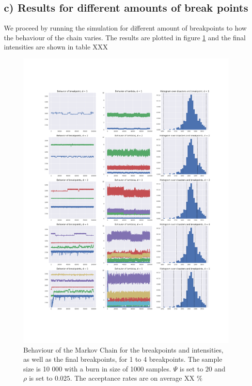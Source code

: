 \documentclass[a4paper]{article}
\begin{document}
\subsection*{c) Results for different amounts of break points}

We proceed by running the simulation for different amount of breakpoints to how the behaviour of the chain varies. The results are plotted in figure \ref{fig:num_breakpoints_results} and the final intensities are shown in table XXX

\begin{figure}[H]
    \centering
    \includegraphics[width = 1.0\textwidth]{images/chain_behavior.png} 
    \caption{Behaviour of the Markov Chain for the breakpoints and intensities, as well as the final breakpoints, for 1 to 4 breakpoints. The sample size is 10 000 with a burn in size of 1000 samples. $\Psi$ is set to $20$ and $\rho$ is set to $0.025$. The acceptance rates are on average XX \%}
    \label{fig:num_breakpoints_results}
\end{figure}
\end{document}

